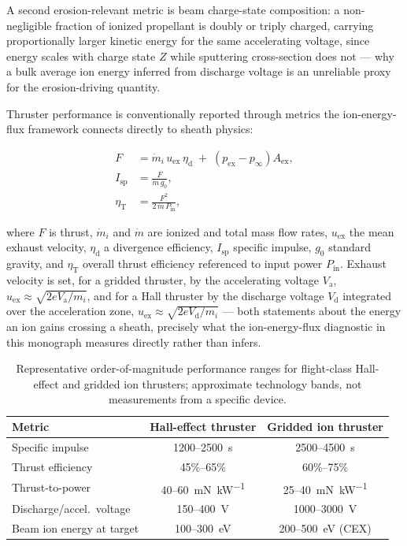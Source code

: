 A second erosion-relevant metric is beam charge-state composition: a non-negligible fraction of ionized propellant is doubly or triply charged, carrying proportionally larger kinetic energy for the same accelerating voltage, since energy scales with charge state $Z$ while sputtering cross-section does not — why a bulk average ion energy inferred from discharge voltage is an unreliable proxy for the erosion-driving quantity.

Thruster performance is conventionally reported through metrics the ion-energy-flux framework connects directly to sheath physics:

\begin{align}
F &= \dot m_i \, u_{\mathrm{ex}} \, \eta_{\mathrm{d}} \;+\; (p_{\mathrm{ex}} - p_{\infty})A_{\mathrm{ex}}, \label{eq:thrust} \\
I_{\mathrm{sp}} &= \frac{F}{\dot m \, g_0}, \label{eq:isp} \\
\eta_{\mathrm{T}} &= \frac{F^2}{2\,\dot m\, P_{\mathrm{in}}}, \label{eq:effT}
\end{align}

where $F$ is thrust, $\dot m_i$ and $\dot m$ are ionized and total mass flow rates, $u_{\mathrm{ex}}$ the mean exhaust velocity, $\eta_{\mathrm{d}}$ a divergence efficiency, $I_{\mathrm{sp}}$ specific impulse, $g_0$ standard gravity, and $\eta_{\mathrm{T}}$ overall thrust efficiency referenced to input power $P_{\mathrm{in}}$. Exhaust velocity is set, for a gridded thruster, by the accelerating voltage $V_{\mathrm{a}}$, $u_{\mathrm{ex}} \approx \sqrt{2eV_{\mathrm{a}}/m_i}$, and for a Hall thruster by the discharge voltage $V_{\mathrm{d}}$ integrated over the acceleration zone, $u_{\mathrm{ex}} \approx \sqrt{2eV_{\mathrm{d}}/m_i}$ — both statements about the energy an ion gains crossing a sheath, precisely what the ion-energy-flux diagnostic in this monograph measures directly rather than infers.

\begin{table}[htbp]
\centering
\caption{Representative order-of-magnitude performance ranges for flight-class Hall-effect and gridded ion thrusters; approximate technology bands, not measurements from a specific device.}
\label{tab:ep-perf}
\begin{tabular}{lcc}
\toprule
Metric & Hall-effect thruster & Gridded ion thruster \\
\midrule
Specific impulse & \SI{1200}{}--\SI{2500}{\second} & \SI{2500}{}--\SI{4500}{\second} \\
Thrust efficiency & 45\%--65\% & 60\%--75\% \\
Thrust-to-power & \SI{40}{}--\SI{60}{\milli\newton\per\kilo\watt} & \SI{25}{}--\SI{40}{\milli\newton\per\kilo\watt} \\
Discharge/accel.\ voltage & \SI{150}{}--\SI{400}{\volt} & \SI{1000}{}--\SI{3000}{\volt} \\
Beam ion energy at target & \SI{100}{}--\SI{300}{\electronvolt} & \SI{200}{}--\SI{500}{\electronvolt} (CEX) \\
\bottomrule
\end{tabular}
\end{table}

